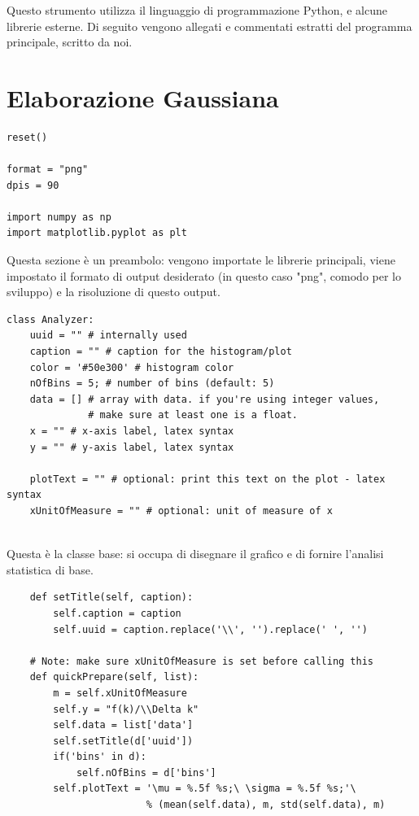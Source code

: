 Questo strumento utilizza il linguaggio di programmazione Python, e alcune librerie esterne. Di seguito vengono allegati e commentati estratti del programma principale, scritto da noi.

\section{Elaborazione Gaussiana}

\begin{lstlisting}
reset()

format = "png"
dpis = 90

import numpy as np
import matplotlib.pyplot as plt
\end{lstlisting}

Questa sezione è un preambolo: vengono importate le librerie principali, viene impostato il formato di output desiderato (in questo caso "png", comodo per lo sviluppo) e la risoluzione di questo output.

\begin{lstlisting}
class Analyzer:
    uuid = "" # internally used
    caption = "" # caption for the histogram/plot
    color = '#50e300' # histogram color
    nOfBins = 5; # number of bins (default: 5)
    data = [] # array with data. if you're using integer values,
    		  # make sure at least one is a float.
    x = "" # x-axis label, latex syntax
    y = "" # y-axis label, latex syntax
    
    plotText = "" # optional: print this text on the plot - latex syntax
    xUnitOfMeasure = "" # optional: unit of measure of x
    
\end{lstlisting}

Questa è la classe base: si occupa di disegnare il grafico e di fornire l'analisi statistica di base.

\begin{lstlisting}
    def setTitle(self, caption):
        self.caption = caption
        self.uuid = caption.replace('\\', '').replace(' ', '')
        
    # Note: make sure xUnitOfMeasure is set before calling this
    def quickPrepare(self, list):
        m = self.xUnitOfMeasure
        self.y = "f(k)/\\Delta k"
        self.data = list['data']
        self.setTitle(d['uuid'])
        if('bins' in d):
            self.nOfBins = d['bins']
        self.plotText = '\mu = %.5f %s;\ \sigma = %.5f %s;'\
                        % (mean(self.data), m, std(self.data), m)
                        
\end{lstlisting}

